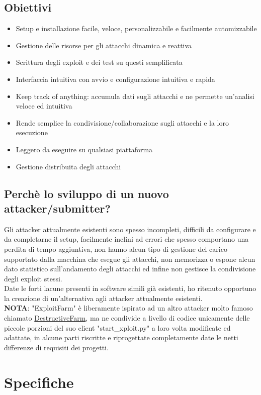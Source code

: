 \documentclass[11pt]{article}
\begin{document}
\subsection{Obiettivi}
\begin{itemize}
    \item Setup e installazione facile, veloce, personalizzabile e facilmente automizzabile
    \item Gestione delle risorse per gli attacchi dinamica e reattiva
    \item Scrittura degli exploit e dei test su questi semplificata
    \item Interfaccia intuitiva con avvio e configurazione intuitiva e rapida
    \item Keep track of anything: accumula dati sugli attacchi e ne permette un'analisi veloce ed intuitiva
    \item Rende semplice la condivisione/collaborazione sugli attacchi e la loro esecuzione
    \item Leggero da eseguire su qualsiasi piattaforma
    \item Gestione distribuita degli attacchi
\end{itemize}
\subsection{Perchè lo sviluppo di un nuovo attacker/submitter?}
Gli attacker attualmente esistenti sono spesso incompleti, difficili da configurare e da completarne il setup, facilmente inclini ad errori che spesso comportano una perdita di tempo aggiuntiva, non hanno alcun tipo di gestione del carico supportato dalla macchina che esegue gli attacchi, non memorizza o espone alcun dato statistico sull'andamento degli attacchi ed infine non gestisce la condivisione degli exploit stessi.\\
Date le forti lacune presenti in software simili già esistenti, ho ritenuto opportuno la creazione di un'alternativa agli attacker attualmente esistenti.\\
\textbf{NOTA}: "ExploitFarm" è liberamente ispirato ad un altro attacker molto famoso chiamato \href{https://github.com/DestructiveVoice/DestructiveFarm}{DestructiveFarm}, ma ne condivide a livello di codice unicamente delle piccole porzioni del suo client "start\_xploit.py" a loro volta modificate ed adattate, in alcune parti riscritte e riprogettate completamente date le netti differenze di requisiti dei progetti.
\section{Specifiche}
\end{document}
